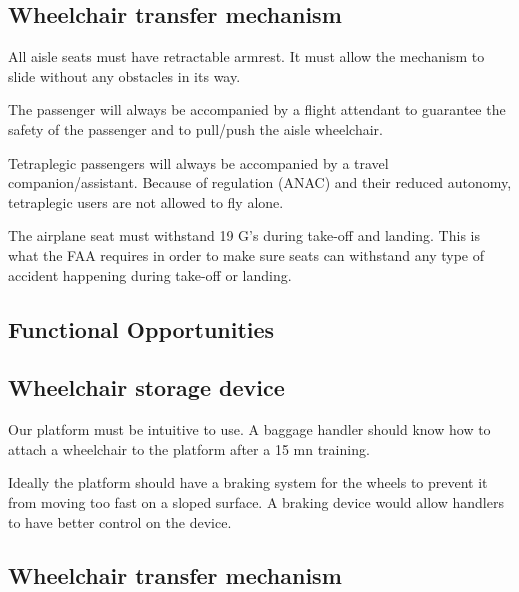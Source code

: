 \subsection*{Wheelchair transfer mechanism}

\begin{list}{-}{}
  \item All aisle seats must have retractable armrest. It must allow the mechanism to slide without any obstacles in its way.
  \item The passenger will always be accompanied by a flight attendant to guarantee the safety of the passenger and to pull/push the aisle wheelchair.
  \item Tetraplegic passengers will always be accompanied by a travel companion/assistant. Because of regulation (ANAC) and their reduced autonomy, tetraplegic users are not allowed to fly alone.
  \item The airplane seat must withstand 19 G's during take-off and landing. This is what the FAA requires in order to make sure seats can withstand any type of accident happening during take-off or landing.
\end{list}

\subsection{Functional Opportunities}

\subsection*{Wheelchair storage device}

\begin{list}{-}{}
  \item Our platform must be intuitive to use. A baggage handler should know how to attach a wheelchair to the platform after a 15 mn training.
  \item Ideally the platform should have a braking system for the wheels to prevent it from moving too fast on a sloped surface. A braking device would allow handlers to have better control on the device.
\end{list}

\subsection*{Wheelchair transfer mechanism}

